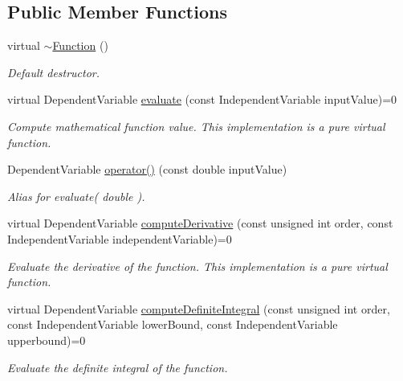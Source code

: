 \subsection*{Public Member Functions}
\begin{DoxyCompactItemize}
\item 
virtual \hyperlink{classtudat_1_1basic__mathematics_1_1Function_ae438d4c770503bfdf34c812e4f47cf09}{$\sim$\+Function} ()\hypertarget{classtudat_1_1basic__mathematics_1_1Function_ae438d4c770503bfdf34c812e4f47cf09}{}\label{classtudat_1_1basic__mathematics_1_1Function_ae438d4c770503bfdf34c812e4f47cf09}

\begin{DoxyCompactList}\small\item\em Default destructor. \end{DoxyCompactList}\item 
virtual Dependent\+Variable \hyperlink{classtudat_1_1basic__mathematics_1_1Function_a69b59769da9784abaaa8a0a309d16de8}{evaluate} (const Independent\+Variable input\+Value)=0
\begin{DoxyCompactList}\small\item\em Compute mathematical function value. This implementation is a pure virtual function. \end{DoxyCompactList}\item 
Dependent\+Variable \hyperlink{classtudat_1_1basic__mathematics_1_1Function_a4b135236b9531d0329c151afeef8a2d8}{operator()} (const double input\+Value)\hypertarget{classtudat_1_1basic__mathematics_1_1Function_a4b135236b9531d0329c151afeef8a2d8}{}\label{classtudat_1_1basic__mathematics_1_1Function_a4b135236b9531d0329c151afeef8a2d8}

\begin{DoxyCompactList}\small\item\em Alias for evaluate( double ). \end{DoxyCompactList}\item 
virtual Dependent\+Variable \hyperlink{classtudat_1_1basic__mathematics_1_1Function_a0929cfbeb90a6cbc85d50455fd01d75f}{compute\+Derivative} (const unsigned int order, const Independent\+Variable independent\+Variable)=0
\begin{DoxyCompactList}\small\item\em Evaluate the derivative of the function. This implementation is a pure virtual function. \end{DoxyCompactList}\item 
virtual Dependent\+Variable \hyperlink{classtudat_1_1basic__mathematics_1_1Function_a74c5639b8c6288471368e65312569e52}{compute\+Definite\+Integral} (const unsigned int order, const Independent\+Variable lower\+Bound, const Independent\+Variable upperbound)=0
\begin{DoxyCompactList}\small\item\em Evaluate the definite integral of the function. \end{DoxyCompactList}\end{DoxyCompactItemize}


